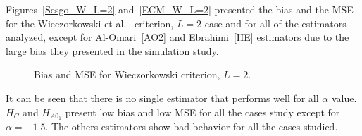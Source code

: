 \documentclass[journal]{IEEEtran}
\begin{document}
Figures~\ref{Sesgo_W_L=2} and~\ref{ECM_W_L=2} presented the bias and the MSE for the Wieczorkowski et al.~\cite{Wieczorkowski1999} criterion, $L=2$ case and for all of the estimators analyzed, except for Al-Omari~\eqref{AO2} and Ebrahimi~\eqref{HE} estimators due to the large bias they presented in the simulation study.  
\begin{figure}[hbt]
    \centering
	\caption{Bias and MSE for Wieczorkowski criterion, $L=2$.}
	\end{figure}    
It can be seen that there is no single estimator that performs well for all $\alpha$ value. $H_C$ and $H_{A0_1}$ present low bias and low MSE for all the cases study except for $\alpha=-1.5$. The others estimators show bad behavior for all the cases studied.	
\end{document}
